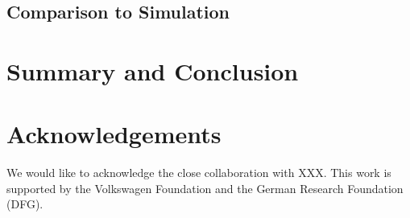 \documentclass[a4paper,11pt]{article}
\begin{document}
\subsection{Comparison to Simulation}



\section{\label{Sec:Summary}Summary and Conclusion}


\section*{Acknowledgements}

We would like to acknowledge the close collaboration with XXX. This work is supported by the Volkswagen Foundation and the German Research Foundation (DFG).


\end{document}
